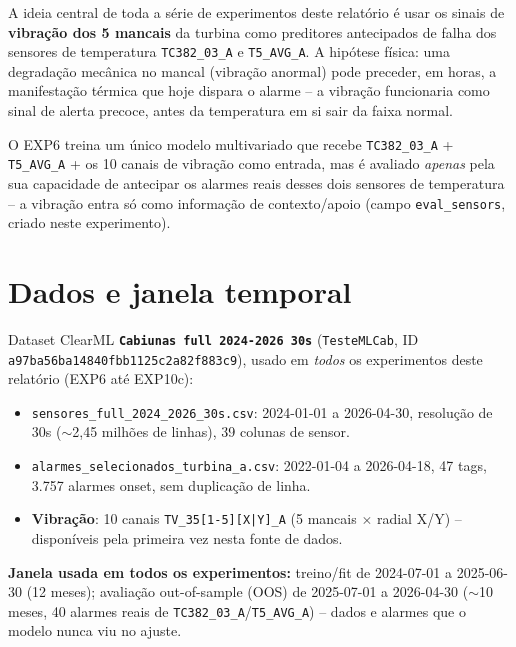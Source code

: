 \documentclass[11pt,a4paper]{article}
\begin{document}
A ideia central de toda a série de experimentos deste relatório é usar os
sinais de \textbf{vibração dos 5 mancais} da turbina como preditores
antecipados de falha dos sensores de temperatura \texttt{TC382\_03\_A} e
\texttt{T5\_AVG\_A}. A hipótese física: uma degradação mecânica no mancal
(vibração anormal) pode preceder, em horas, a manifestação térmica que
hoje dispara o alarme -- a vibração funcionaria como sinal de alerta
precoce, antes da temperatura em si sair da faixa normal.

O EXP6 treina um único modelo multivariado que recebe
\texttt{TC382\_03\_A} + \texttt{T5\_AVG\_A} + os 10 canais de vibração como
entrada, mas é avaliado \emph{apenas} pela sua capacidade de antecipar os
alarmes reais desses dois sensores de temperatura -- a vibração entra só
como informação de contexto/apoio (campo \texttt{eval\_sensors}, criado
neste experimento).

\section{Dados e janela temporal}
\label{sec:dados-exp6}

Dataset ClearML \textbf{\texttt{Cabiunas full 2024-2026 30s}}
(\texttt{TesteMLCab}, ID \texttt{a97ba56ba14840fbb1125c2a82f883c9}), usado
em \emph{todos} os experimentos deste relatório (EXP6 até EXP10c):

\begin{itemize}
  \item \texttt{sensores\_full\_2024\_2026\_30s.csv}: 2024-01-01 a
        2026-04-30, resolução de 30s ($\sim$2,45 milhões de linhas), 39
        colunas de sensor.
  \item \texttt{alarmes\_selecionados\_turbina\_a.csv}: 2022-01-04 a
        2026-04-18, 47 tags, 3.757 alarmes onset, sem duplicação de linha.
  \item \textbf{Vibração}: 10 canais \texttt{TV\_35[1-5][X|Y]\_A} (5
        mancais $\times$ radial X/Y) -- disponíveis pela primeira vez
        nesta fonte de dados.
\end{itemize}

\textbf{Janela usada em todos os experimentos:} treino/fit de 2024-07-01 a
2025-06-30 (12 meses); avaliação out-of-sample (OOS) de 2025-07-01 a
2026-04-30 ($\sim$10 meses, 40 alarmes reais de
\texttt{TC382\_03\_A}/\texttt{T5\_AVG\_A}) -- dados e alarmes que o modelo
nunca viu no ajuste.
\end{document}
